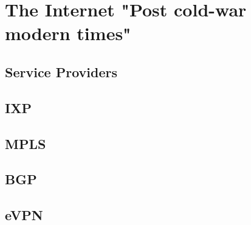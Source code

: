 \documentclass[a4paper,12pt,twoside,twocolumn,landscape]{book}
\begin{document}



\chapter{The Internet {\footnotesize "Post cold-war modern times"}}

\section{Service Providers}

\section{IXP}

\section{MPLS}

\section{BGP}

\section{eVPN}


\renewcommand{\listfigurename}{List of {\footnotesize hidden} Figures}
\listoffigures


\renewcommand{\listtablename}{Tables {\footnotesize hidding} on the pages}
\listoftables




\end{document}
